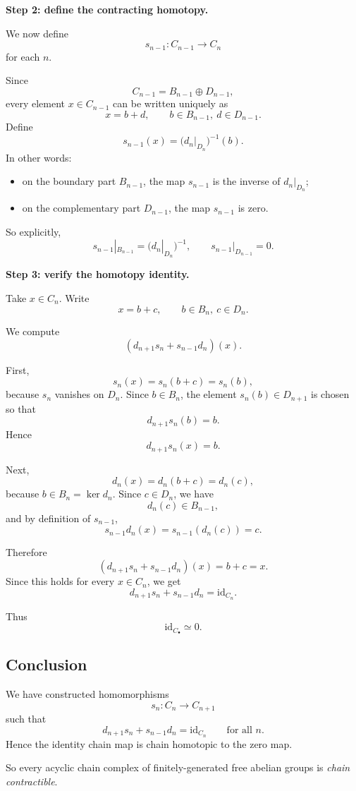 \documentclass[12pt,a4paper]{article}
\theoremstyle{notespace}
\begin{document}
\textbf{Step 2: define the contracting homotopy.}

We now define
\[
s_{n-1}:C_{n-1}\to C_n
\]
for each \(n\).

Since
\[
C_{n-1}=B_{n-1}\oplus D_{n-1},
\]
every element \(x\in C_{n-1}\) can be written uniquely as
\[
x=b+d,
\qquad
b\in B_{n-1},\ d\in D_{n-1}.
\]
Define
\[
s_{n-1}(x)=\bigl(d_n|_{D_n}\bigr)^{-1}(b).
\]
In other words:
\begin{itemize}
	\item on the boundary part \(B_{n-1}\), the map \(s_{n-1}\) is the inverse of \(d_n|_{D_n}\);
	\item on the complementary part \(D_{n-1}\), the map \(s_{n-1}\) is zero.
\end{itemize}

So explicitly,
\[
s_{n-1}|_{B_{n-1}}=(d_n|_{D_n})^{-1},
\qquad
s_{n-1}|_{D_{n-1}}=0.
\]

\medskip

\textbf{Step 3: verify the homotopy identity.}

Take \(x\in C_n\). Write
\[
x=b+c,
\qquad
b\in B_n,\ c\in D_n.
\]

We compute
\[
(d_{n+1}s_n+s_{n-1}d_n)(x).
\]

First,
\[
s_n(x)=s_n(b+c)=s_n(b),
\]
because \(s_n\) vanishes on \(D_n\). Since \(b\in B_n\), the element \(s_n(b)\in D_{n+1}\) is chosen so that
\[
d_{n+1}s_n(b)=b.
\]
Hence
\[
d_{n+1}s_n(x)=b.
\]

Next,
\[
d_n(x)=d_n(b+c)=d_n(c),
\]
because \(b\in B_n=\ker d_n\). Since \(c\in D_n\), we have
\[
d_n(c)\in B_{n-1},
\]
and by definition of \(s_{n-1}\),
\[
s_{n-1}d_n(x)=s_{n-1}(d_n(c))=c.
\]

Therefore
\[
(d_{n+1}s_n+s_{n-1}d_n)(x)=b+c=x.
\]
Since this holds for every \(x\in C_n\), we get
\[
d_{n+1}s_n+s_{n-1}d_n=\mathrm{id}_{C_n}.
\]

Thus
\[
\mathrm{id}_{C_\bullet}\simeq 0.
\]

\subsection{Conclusion}

We have constructed homomorphisms
\[
s_n:C_n\to C_{n+1}
\]
such that
\[
d_{n+1}s_n+s_{n-1}d_n=\mathrm{id}_{C_n}
\qquad\text{for all }n.
\]
Hence the identity chain map is chain homotopic to the zero map.

So every acyclic chain complex of finitely-generated free abelian groups is \emph{chain contractible}.
\end{document}
